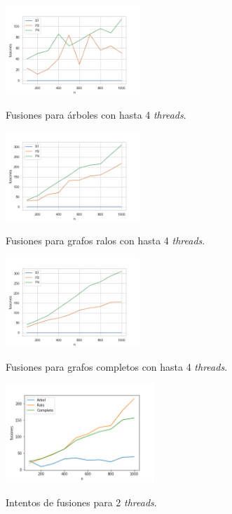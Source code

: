 \newpage

\begin{figure}[h]
   \centering
   \caption{Fusiones para árboles con hasta 4 \textit{threads}.}
   \includegraphics[width=0.45\textwidth]{imagenes/fusiones-arboles.png}
   \label{fig:fusionesarboles}
\end{figure}

\begin{figure}[h]
   \centering
   \caption{Fusiones para grafos ralos con hasta 4 \textit{threads}.}
   \includegraphics[width=0.45\textwidth]{imagenes/fusiones-ralos.png}
   \label{fig:fusionesralos}
\end{figure}

\begin{figure}[h]
   \centering
   \caption{Fusiones para grafos completos con hasta 4 \textit{threads}.}
   \includegraphics[width=0.45\textwidth]{imagenes/fusiones-completos.png}
   \label{fig:fusionescompletos}
\end{figure}

\newpage

\begin{figure}[h]
   \centering
   \caption{Intentos de fusiones para 2 \textit{threads}.}
   \includegraphics[width=0.5\textwidth]{imagenes/intentos-fusiones-2-threads.png}
   \label{fig:intentos2threads}
\end{figure}

